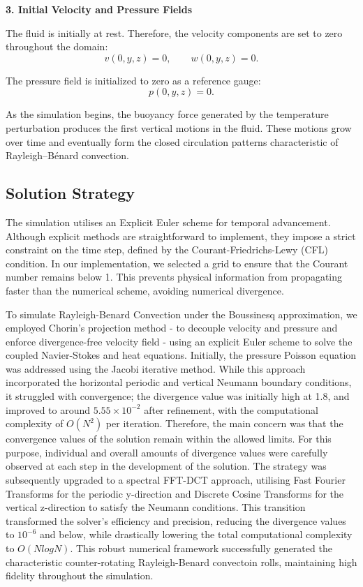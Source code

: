 \textbf{3. Initial Velocity and Pressure Fields}

The fluid is initially at rest. Therefore, the velocity components are set to zero throughout the domain:
\begin{equation}
v(0,y,z) = 0, \qquad w(0,y,z) = 0 .
\end{equation}

The pressure field is initialized to zero as a reference gauge:
\begin{equation}
p(0,y,z) = 0 .
\end{equation}

As the simulation begins, the buoyancy force generated by the temperature perturbation produces the first vertical motions in the fluid. These motions grow over time and eventually form the closed circulation patterns characteristic of Rayleigh--Bénard convection.



\subsection{Solution Strategy}

The simulation utilises an Explicit Euler scheme for temporal advancement. Although explicit methods are straightforward to implement, they impose a strict constraint on the time step, defined by the Courant-Friedrichs-Lewy (CFL) condition. In our implementation, we selected a grid to ensure that the Courant number remains below 1. This prevents physical information from propagating faster than the numerical scheme, avoiding numerical divergence.

To simulate Rayleigh-Benard Convection under the Boussinesq approximation, we employed Chorin's projection method - to decouple velocity and pressure and enforce divergence-free velocity field - using an explicit Euler scheme to solve the coupled Navier-Stokes and heat equations. Initially, the pressure Poisson equation was addressed using the Jacobi iterative method. While this approach incorporated the horizontal periodic and vertical Neumann boundary conditions, it struggled with convergence; the divergence value was initially high at 1.8, and improved to around $5.55 \times 10^{-2}$ after refinement, with the computational complexity of $O(N^{2})$ per iteration.
Therefore, the main concern was that the convergence values of the solution remain within the allowed limits. For this purpose, individual and overall amounts of divergence values were carefully observed at each step in the development of the solution. The strategy was subsequently upgraded to a spectral FFT-DCT approach, utilising Fast Fourier Transforms for the periodic y-direction and Discrete Cosine Transforms for the vertical z-direction to satisfy the Neumann conditions. This transition transformed the solver's efficiency and precision, reducing the divergence values to $10^{-6}$ and below, while drastically lowering the total computational complexity to $O(NlogN)$. This robust numerical framework successfully generated the characteristic counter-rotating Rayleigh-Benard convectoin rolls, maintaining high fidelity throughout the simulation.